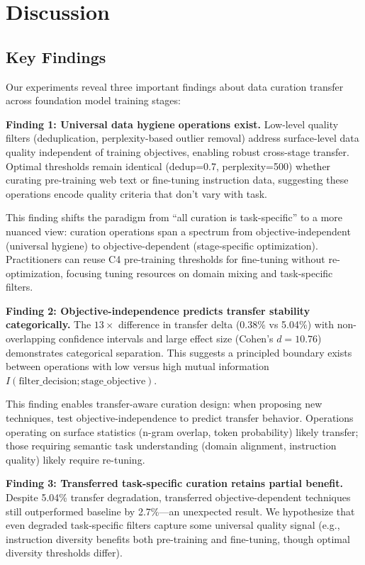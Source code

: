 \section{Discussion}

\subsection{Key Findings}

Our experiments reveal three important findings about data curation transfer across foundation model training stages:

\textbf{Finding 1: Universal data hygiene operations exist.} Low-level quality filters (deduplication, perplexity-based outlier removal) address surface-level data quality independent of training objectives, enabling robust cross-stage transfer. Optimal thresholds remain identical (dedup=0.7, perplexity=500) whether curating pre-training web text or fine-tuning instruction data, suggesting these operations encode quality criteria that don't vary with task.

This finding shifts the paradigm from ``all curation is task-specific'' to a more nuanced view: curation operations span a spectrum from objective-independent (universal hygiene) to objective-dependent (stage-specific optimization). Practitioners can reuse C4 pre-training thresholds for fine-tuning without re-optimization, focusing tuning resources on domain mixing and task-specific filters.

\textbf{Finding 2: Objective-independence predicts transfer stability categorically.} The $13\times$ difference in transfer delta (0.38\% vs 5.04\%) with non-overlapping confidence intervals and large effect size (Cohen's $d=10.76$) demonstrates categorical separation. This suggests a principled boundary exists between operations with low versus high mutual information $I(\text{filter\_decision}; \text{stage\_objective})$.

This finding enables transfer-aware curation design: when proposing new techniques, test objective-independence to predict transfer behavior. Operations operating on surface statistics (n-gram overlap, token probability) likely transfer; those requiring semantic task understanding (domain alignment, instruction quality) likely require re-tuning.

\textbf{Finding 3: Transferred task-specific curation retains partial benefit.} Despite 5.04\% transfer degradation, transferred objective-dependent techniques still outperformed baseline by 2.7\%—an unexpected result. We hypothesize that even degraded task-specific filters capture some universal quality signal (e.g., instruction diversity benefits both pre-training and fine-tuning, though optimal diversity thresholds differ).

